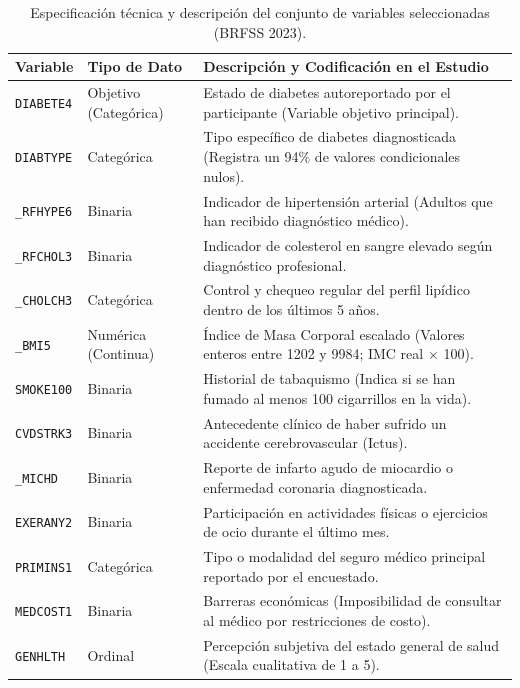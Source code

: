 \documentclass[journal]{IEEEtran}
\begin{document}
\begin{table}[t]
\centering
\small
\caption{Especificación técnica y descripción del conjunto de variables seleccionadas (BRFSS 2023).}
\label{tab:variables}
\begin{tabular}{|l|l|p{11cm}|}
\hline
\textbf{Variable} & \textbf{Tipo de Dato} & \textbf{Descripción y Codificación en el Estudio} \\
\hline
\texttt{DIABETE4}  & Objetivo (Categórica) & Estado de diabetes autoreportado por el participante (Variable objetivo principal). \\
\texttt{DIABTYPE}  & Categórica            & Tipo específico de diabetes diagnosticada (Registra un 94\% de valores condicionales nulos). \\
\texttt{\_RFHYPE6} & Binaria               & Indicador de hipertensión arterial (Adultos que han recibido diagnóstico médico). \\
\texttt{\_RFCHOL3} & Binaria               & Indicador de colesterol en sangre elevado según diagnóstico profesional. \\
\texttt{\_CHOLCH3} & Categórica            & Control y chequeo regular del perfil lipídico dentro de los últimos 5 años. \\
\texttt{\_BMI5}    & Numérica (Continua)   & Índice de Masa Corporal escalado (Valores enteros entre 1202 y 9984; IMC real $\times$ 100). \\
\texttt{SMOKE100}  & Binaria               & Historial de tabaquismo (Indica si se han fumado al menos 100 cigarrillos en la vida). \\
\texttt{CVDSTRK3}  & Binaria               & Antecedente clínico de haber sufrido un accidente cerebrovascular (Ictus). \\
\texttt{\_MICHD}   & Binaria               & Reporte de infarto agudo de miocardio o enfermedad coronaria diagnosticada. \\
\texttt{EXERANY2}  & Binaria               & Participación en actividades físicas o ejercicios de ocio durante el último mes. \\
\texttt{PRIMINS1}  & Categórica            & Tipo o modalidad del seguro médico principal reportado por el encuestado. \\
\texttt{MEDCOST1}  & Binaria               & Barreras económicas (Imposibilidad de consultar al médico por restricciones de costo). \\
\texttt{GENHLTH}   & Ordinal               & Percepción subjetiva del estado general de salud (Escala cualitativa de 1 a 5). \\

\end{tabular}
\end{table}
\end{document}
